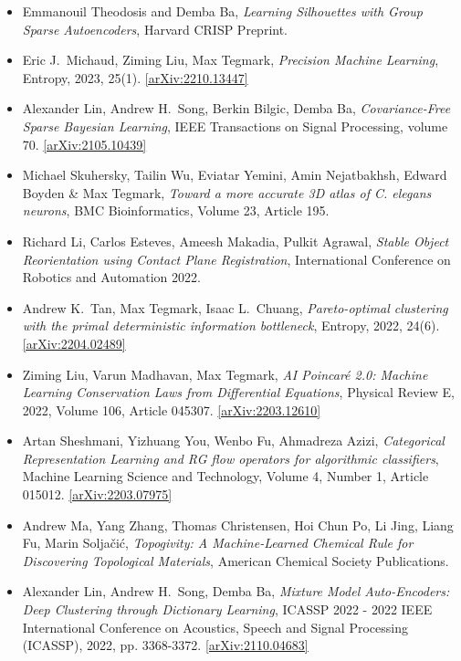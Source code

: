 \begin{itemize}
\item Emmanouil Theodosis and Demba Ba, \textit{Learning Silhouettes with Group Sparse Autoencoders}, Harvard CRISP Preprint. 
\item Eric J.\  Michaud, Ziming Liu, Max Tegmark, \textit{Precision Machine Learning}, Entropy, 2023, 25(1). \href{https://arxiv.org/abs/2210.13447}{[arXiv:2210.13447]} 
\item Alexander Lin, Andrew H.\  Song, Berkin Bilgic, Demba Ba, \textit{Covariance-Free Sparse Bayesian Learning}, IEEE Transactions on Signal Processing, volume 70. \href{https://arxiv.org/abs/2105.10439}{[arXiv:2105.10439]} 
\item Michael Skuhersky, Tailin Wu, Eviatar Yemini, Amin Nejatbakhsh, Edward Boyden & Max Tegmark, \textit{Toward a more accurate 3D atlas of C. elegans neurons}, BMC Bioinformatics, Volume 23, Article 195. 
\item Richard Li, Carlos Esteves, Ameesh Makadia, Pulkit Agrawal, \textit{Stable Object Reorientation using Contact Plane Registration}, International Conference on Robotics and Automation 2022. 
\item Andrew K.\  Tan, Max Tegmark, Isaac L.\  Chuang, \textit{Pareto-optimal clustering with the primal deterministic information bottleneck}, Entropy, 2022, 24(6). \href{https://arxiv.org/abs/2204.02489}{[arXiv:2204.02489]} 
\item Ziming Liu, Varun Madhavan, Max Tegmark, \textit{AI Poincaré 2.0: Machine Learning Conservation Laws from Differential Equations}, Physical Review E, 2022, Volume 106, Article 045307. \href{https://arxiv.org/abs/2203.12610}{[arXiv:2203.12610]} 
\item Artan Sheshmani, Yizhuang You, Wenbo Fu, Ahmadreza Azizi, \textit{Categorical Representation Learning and RG flow operators for algorithmic classifiers}, Machine Learning Science and Technology, Volume 4, Number 1, Article 015012. \href{https://arxiv.org/abs/2203.07975}{[arXiv:2203.07975]} 
\item Andrew Ma, Yang Zhang, Thomas Christensen, Hoi Chun Po, Li Jing, Liang Fu, Marin Soljačić, \textit{Topogivity: A Machine-Learned Chemical Rule for Discovering Topological Materials}, American Chemical Society Publications. 
\item Alexander Lin, Andrew H.\  Song, Demba Ba, \textit{Mixture Model Auto-Encoders: Deep Clustering through Dictionary Learning}, ICASSP 2022 - 2022 IEEE International Conference on Acoustics, Speech and Signal Processing (ICASSP), 2022, pp. 3368-3372. \href{https://arxiv.org/abs/2110.04683}{[arXiv:2110.04683]} 

\end{itemize}
